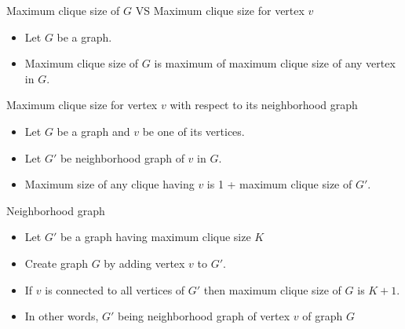 \documentclass[landscape]{slides}
\begin{document}
\begin{slide}
	\begin{center}
		{\large Maximum clique size of {$G$} {\small VS} Maximum clique size for vertex {$v$}}
	\end{center}
	\begin{itemize}
		\setlength{\itemsep}{0pt}
		\setlength{\parskip}{0pt}
		\setlength{\parsep}{0pt}
		\item Let {$G$} be a graph.
		\item Maximum clique size of {$G$} is maximum of maximum clique size of any vertex in {$G$}.
	\end{itemize}
\end{slide}

\begin{slide}
	\begin{center}
		{\large Maximum clique size for vertex {$v$} {\small with respect to} its neighborhood graph }
	\end{center}
	\begin{itemize}
		\setlength{\itemsep}{0pt}
		\setlength{\parskip}{0pt}
		\setlength{\parsep}{0pt}
		\item Let {$G$} be a graph and {$v$} be one of its vertices.
		\item Let {$G'$} be neighborhood graph of {$v$} in {$G$}.
		\item Maximum size of any clique having {$v$} is 1 + maximum clique size of {$G'$}.
	\end{itemize}
\end{slide}

\begin{slide}
\begin{center}
	{\large Neighborhood graph }

\end{center}

	\begin{itemize}
		\setlength{\itemsep}{0pt}
		\setlength{\parskip}{0pt}
		\setlength{\parsep}{0pt}
		\item Let {$G'$} be a graph having maximum clique size {$K$}
		\item Create graph {$G$} by adding vertex {$v$} to {$G'$}.
		\item If {$v$} is connected to all vertices of {$G'$} then maximum clique size of {$G$} is {$K + 1$}.
		\item In other words, {$G'$} being neighborhood graph of vertex {$v$} of graph {$G$}
	\end{itemize}
\end{slide}
\end{document}
